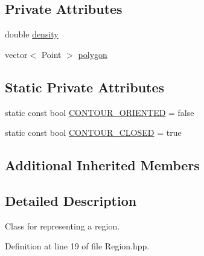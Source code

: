 \subsection*{Private Attributes}
\begin{DoxyCompactItemize}
\item 
double \hyperlink{classmultiscale_1_1analysis_1_1Region_af4eb62fddbe850271dfe15bb240b13bb}{density}
\item 
vector$<$ Point $>$ \hyperlink{classmultiscale_1_1analysis_1_1Region_a40d1b47f30bb09c6a47521a968163b6d}{polygon}
\end{DoxyCompactItemize}
\subsection*{Static Private Attributes}
\begin{DoxyCompactItemize}
\item 
static const bool \hyperlink{classmultiscale_1_1analysis_1_1Region_a875a0f14dacf6904cabfa1f31020e6e2}{C\-O\-N\-T\-O\-U\-R\-\_\-\-O\-R\-I\-E\-N\-T\-E\-D} = false
\item 
static const bool \hyperlink{classmultiscale_1_1analysis_1_1Region_a52c0c66ccfe38dc19379abaeba529f19}{C\-O\-N\-T\-O\-U\-R\-\_\-\-C\-L\-O\-S\-E\-D} = true
\end{DoxyCompactItemize}
\subsection*{Additional Inherited Members}


\subsection{Detailed Description}
Class for representing a region. 

Definition at line 19 of file Region.\-hpp.



